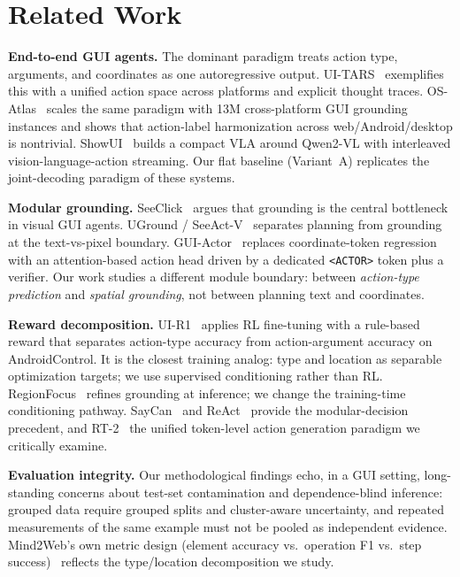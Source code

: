 \section{Related Work}

\textbf{End-to-end GUI agents.} The dominant paradigm treats action type,
arguments, and coordinates as one autoregressive output. UI-TARS~\cite{uitars}
exemplifies this with a unified action space across platforms and explicit
thought traces. OS-Atlas~\cite{osatlas} scales the same paradigm with 13M
cross-platform GUI grounding instances and shows that action-label
harmonization across web/Android/desktop is nontrivial. ShowUI~\cite{showui}
builds a compact VLA around Qwen2-VL with interleaved vision-language-action
streaming. Our flat baseline (Variant~A) replicates the joint-decoding
paradigm of these systems.

\textbf{Modular grounding.} SeeClick~\cite{seeclick} argues that grounding
is the central bottleneck in visual GUI agents. UGround /
SeeAct-V~\cite{uground} separates planning from grounding at the
text-vs-pixel boundary. GUI-Actor~\cite{guiactor} replaces coordinate-token
regression with an attention-based action head driven by a dedicated
\texttt{<ACTOR>} token plus a verifier. Our work studies a different module
boundary: between \emph{action-type prediction} and \emph{spatial
grounding}, not between planning text and coordinates.

\textbf{Reward decomposition.} UI-R1~\cite{uir1} applies RL fine-tuning
with a rule-based reward that separates action-type accuracy from
action-argument accuracy on AndroidControl. It is the closest training
analog: type and location as separable optimization targets; we use
supervised conditioning rather than RL. RegionFocus~\cite{regionfocus}
refines grounding at inference; we change the training-time conditioning
pathway. SayCan~\cite{saycan} and ReAct~\cite{react} provide the
modular-decision precedent, and RT-2~\cite{rt2} the unified token-level
action generation paradigm we critically examine.

\textbf{Evaluation integrity.} Our methodological findings echo, in a GUI
setting, long-standing concerns about test-set contamination and
dependence-blind inference: grouped data require grouped splits and
cluster-aware uncertainty, and repeated measurements of the same example
must not be pooled as independent evidence. Mind2Web's own metric design
(element accuracy vs.\ operation F1 vs.\ step success)~\cite{mind2web}
reflects the type/location decomposition we study.

